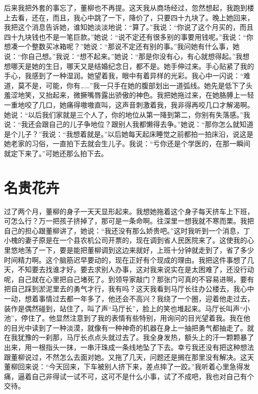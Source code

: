 \documentclass[12pt,oneside]{book}
\begin{document}
后来我把外套的事忘了，董柳也不再提。这天我从商场经过，忽然想起，我跑到楼上去看，还在，而且，我心中跳了一下，降价了，只要四十九块了。晚上她回来，我把这个消息告诉她，谁知她淡淡地说：``算了。''我说：``你说了这个月买的，而且四十九块钱也不是一笔巨款。''她说：``说不定还有很多别的事要用钱呢。''我说：``你想凑一个整数买冰箱呢？''她说：``那说不定还有别的事。''我问她有什么事，她说：``你自己想。''我说：``想不起来。''她说：``那是你没有心，有心就想得起。''我想想哪天是她的生日，哪天又是结婚纪念日，都不是。她手伸过来。手心贴紧了我的手心，我感到了一种湿润。她望着我，眼中有着异样的光彩。我心中一闪说：``难道，莫不是，可能，你有\ldots\ldots{}''我一只手在她的腹部划出一道弧线。她先是低下了头羞涩地笑，又抬起来，微撅嘴唇露出骄傲的神色。我把她拖过来，在她胳膊上一轻一重地咬了几口，她痛得嗷嗷直叫，这声音刺激着我，我非得再咬几口才解渴啊。她说：``以后我们家就是三个人了，你的地位从第一降到第二，你别有失落感。''我说：``我还会跟自己的儿子争地位？跟别人我都懒得去争。''她说：``那你怎么就知道是个儿子？''我说：``我想着就是。''以后她每天起床睡觉之前都拍一拍床沿，说这是她老家的习俗，一直拍下去就会生儿子。我说：``亏你还是个学医的，在那一瞬间就定下来了。''可她还那么拍下去。


\chapter{名贵花卉}

过了两个月，董柳的身子一天天显形起来。我想她拖着这个身子每天挤车上下班，可怎么行？万一把孩子挤掉了，那可是一条命啊。往深里一想我就不寒而栗。我把自己的担心跟董柳讲了，她说：``我还没有那么娇贵吧。''这时我听到一个消息，丁小槐的妻子原是在一个县农机公司开票的，现在调到省人民医院来了。这使我的心里悠地荡了一下，要是能把董柳调到这边来就好，上班十分钟就走到了，省了多少时间精力啊。这个脑筋迟早要动的，现在正好有个现成的理由。我把这件事想了几天，不知要去找谁才好。要去求别人办事，这对我来说实在是太困难了，还没行动呢，自己就在心里把自己堵死了。到领导家敲门？那张门可真的不容易进啊，要有把自己踩到淤泥里去的勇气才行，我有吗？这天我看到马厅长往办公楼去，我心中一动，想着事情过去都一年多了，他还会不高兴？我绕了一个圈，迎着他走过去，装作是偶然碰到，站住了，叫了声``马厅长''，脸上的笑也堆起来。马厅长叫声``小池''，停住了。他显然注意到了我的表情有些特别，用询问的目光望着我。我在他的目光中读到了一种淡漠，就像有一种神奇的机器在身上一抽把勇气都抽走了。就在我犹豫的一刹那，马厅长点点头就过去了。我全身发热，额头上的汗一颗颗暴了出来，用一根指头一抹，一串汗珠成一条线地坠了下去。幸亏我还没有把这种想法跟董柳说过，不然怎么去面对她。又拖了几天，问题还是搁在那里没有解决。这天董柳回来说：``今天回来，下车被别人挤下来，差点摔了一跤。''我听着心里急得发痛，逼着自己非得试一试不可，这可不是什么小事，试了不成吧，我也对自己有个交待。
\end{document}
